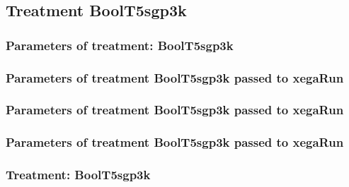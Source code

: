 \documentclass[18pt,c]{beamer}
\begin{document}
\clearpage
\subsection{Treatment BoolT5sgp3k}

 \begin{frame}
 \fontsize{8pt}{9pt}\selectfont
 \frametitle{  Parameters of treatment: BoolT5sgp3k 
 }

 \label{ExpFtParmTable016.tex}  
 \end{frame}


 \begin{frame}
 \fontsize{8pt}{9pt}\selectfont
 \frametitle{  Parameters of treatment BoolT5sgp3k passed to xegaRun
 }

 \label{ExpFtParmTable017.tex}  
 \end{frame}


 \begin{frame}
 \fontsize{8pt}{9pt}\selectfont
 \frametitle{  Parameters of treatment BoolT5sgp3k passed to xegaRun
 }

 \label{ExpFtParmTable018.tex}  
 \end{frame}


 \begin{frame}
 \fontsize{8pt}{9pt}\selectfont
 \frametitle{  Parameters of treatment BoolT5sgp3k passed to xegaRun
 }

 \label{ExpFtParmTable019.tex}  
 \end{frame}

 \begin{frame}
 \fontsize{8pt}{9pt}\selectfont
 \frametitle{ Treatment: BoolT5sgp3k }

 \label{ExpFStatsTable007.tex}  
 \end{frame}
\end{document}
